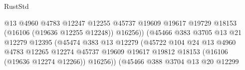 \begin{lexlean}{RustStd}
\begin{coremodule}
                                                    @13
                                                    @4960
                                                    @4783
                                                    @12247
                                                    @12255
                                                    @45737
                                                    @19609
                                                    @19617
                                                    @19729
                                                    @18153
                                                    (@16106 (@19636 @12255 @12248))
                                                    @16256))
                                                (@45466
                                                  @383
                                                  @3705
                                                  @13
                                                  @21
                                                  @12279
                                                  @12395
                                                  (@45474
                                                    @383
                                                    @13
                                                    @12279
                                                    (@45722
                                                      @104
                                                      @24
                                                      @13
                                                      @4960
                                                      @4783
                                                      @12265
                                                      @12274
                                                      @45737
                                                      @19609
                                                      @19617
                                                      @19812
                                                      @18153
                                                      (@16106 (@19636 @12274 @12266))
                                                      @16256))
                                                  (@45466
                                                    @388
                                                    @3704
                                                    @13
                                                    @20
                                                    @12299

\end{coremodule}
\end{lexlean}
